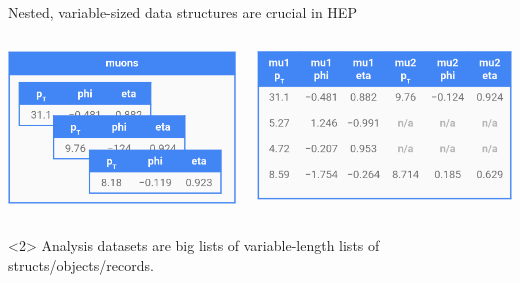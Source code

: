 \documentclass[aspectratio=169]{beamer}
\begin{document}
\begin{frame}[fragile]{Nested, variable-sized data structures are crucial in HEP}
\vspace{0.25 cm}
\begin{columns}
\includegraphics[width=\linewidth]{muons-as-objects.png}

\includegraphics[width=\linewidth]{muons-as-a-table.png}
\end{columns}

\begin{uncoverenv}<2>
\vspace{0.25 cm}
Analysis datasets are big lists of variable-length lists of structs/objects/records.


\end{uncoverenv}
\end{frame}
\end{document}
